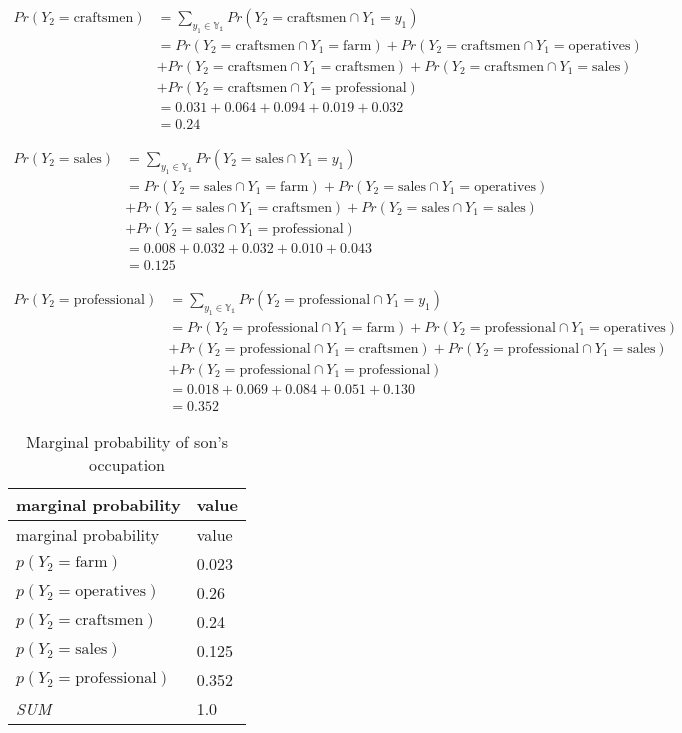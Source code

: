 \documentclass[
  letterpaper,
  DIV=11,
  numbers=noendperiod]{scrreprt}
\begin{document}
\[
\begin{aligned}
    Pr(Y_2 = \text{craftsmen}) &= \sum_{y_1\in\mathbb{Y_1}}Pr(Y_2= \text{craftsmen} \cap Y_1=y_1)\\
    &= Pr(Y_2= \text{craftsmen} \cap Y_1=\text{farm}) + Pr(Y_2= \text{craftsmen} \cap Y_1=\text{operatives}) \\
    & +Pr(Y_2= \text{craftsmen} \cap Y_1=\text{craftsmen}) + Pr(Y_2= \text{craftsmen} \cap Y_1=\text{sales}) \\ 
    & +Pr(Y_2= \text{craftsmen} \cap Y_1=\text{professional})\\
    &= 0.031 + 0.064 + 0.094 + 0.019 + 0.032\\ 
    &= 0.24
\end{aligned}
\]

\[
\begin{aligned}
    Pr(Y_2 = \text{sales}) &= \sum_{y_1\in\mathbb{Y_1}}Pr(Y_2= \text{sales} \cap Y_1=y_1)\\
    &= Pr(Y_2= \text{sales} \cap Y_1=\text{farm}) + Pr(Y_2= \text{sales} \cap Y_1=\text{operatives}) \\
    & +Pr(Y_2= \text{sales} \cap Y_1=\text{craftsmen}) + Pr(Y_2= \text{sales} \cap Y_1=\text{sales}) \\ 
    & +Pr(Y_2= \text{sales} \cap Y_1=\text{professional})\\
    &= 0.008+0.032+0.032+0.010+0.043\\ 
    &= 0.125
\end{aligned}
\]

\[
\begin{aligned}
    Pr(Y_2 = \text{professional}) &= \sum_{y_1\in\mathbb{Y_1}}Pr(Y_2= \text{professional} \cap Y_1=y_1)\\
    &= Pr(Y_2= \text{professional} \cap Y_1=\text{farm}) + Pr(Y_2= \text{professional} \cap Y_1=\text{operatives}) \\
    & +Pr(Y_2= \text{professional} \cap Y_1=\text{craftsmen}) + Pr(Y_2= \text{professional} \cap Y_1=\text{sales}) \\ 
    & +Pr(Y_2= \text{professional} \cap Y_1=\text{professional})\\
    &= 0.018+ 0.069+0.084+0.051+0.130\\ 
    &= 0.352
\end{aligned}
\]

\hypertarget{tbl-son}{}
\begin{longtable}[]{@{}ll@{}}
\caption{\label{tbl-son}Marginal probability of son's
occupation}\tabularnewline
\toprule()
marginal probability & value \\
\midrule()
\endfirsthead
\toprule()
marginal probability & value \\
\midrule()
\endhead
\(p(Y_2=\text{farm})\) & 0.023 \\
\(p(Y_2=\text{operatives})\) & 0.26 \\
\(p(Y_2=\text{craftsmen})\) & 0.24 \\
\(p(Y_2=\text{sales})\) & 0.125 \\
\(p(Y_2=\text{professional})\) & 0.352 \\
\emph{SUM} & 1.0 \\
\bottomrule()
\end{longtable}
\end{document}
